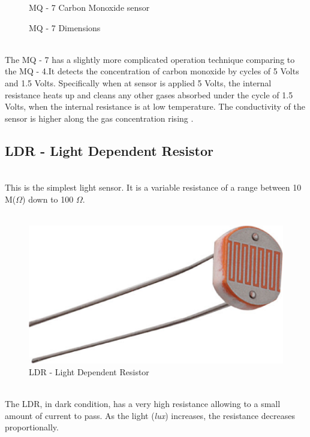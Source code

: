 \documentclass[12pt,a4paper]{report}
\begin{document}
\begin{figure}[H]
\caption{MQ - 7 Carbon Monoxide  sensor}
\caption{MQ - 7 Dimensions}
\end{figure}
\ \\
The MQ - 7 has a slightly more complicated operation technique comparing to the MQ - 4.It detects the concentration of carbon monoxide by cycles of 5 Volts and 1.5 Volts. Specifically when at sensor is applied 5 Volts, the internal resistance heats up and cleans any other gases absorbed under the cycle of 1.5 Volts, when the internal resistance is at low temperature. The conductivity of the sensor is higher along the gas concentration rising \cite{website:mq7_datasheet}.
\ \\
%
\subsection{LDR - Light Dependent Resistor}
\ \\
This is the simplest light sensor. It is a variable resistance of a range between 10 M($\Omega$) down to 100 $\Omega$.
\\ \
\begin{figure}[H]
\centering
\includegraphics*[scale=0.2]{ldr}
\caption{LDR - Light Dependent Resistor}
\end{figure}
\ \\
The LDR, in dark condition, has a very high resistance allowing to a small amount of current to pass. As the light (\textit{lux}) increases, the resistance decreases proportionally.
\ \\
%
\end{document}

